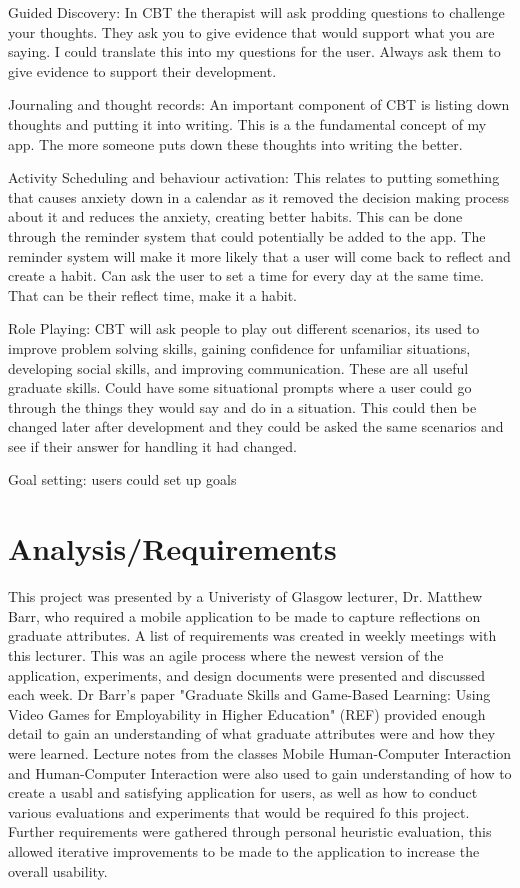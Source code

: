 \documentclass{l4proj}
\begin{document}
Guided Discovery: In CBT the therapist will ask prodding questions to challenge your thoughts. They ask you to give evidence that would support what you are 
saying. I could translate this into my questions for the user. Always ask them to give evidence to support their development.

Journaling and thought records: An important component of CBT is listing down thoughts and putting it into writing. This is a the fundamental concept of my app. 
The more someone puts down these thoughts into writing the better.

Activity Scheduling and behaviour activation: This relates to putting something that causes anxiety down in a calendar as it removed the decision making process 
about it and reduces the anxiety, creating better habits. This can be done through the reminder system that could potentially be added to the app. The reminder 
system will make it more likely that a user will come back to reflect and create a habit. Can ask the user to set a time for every day at the same time. That 
can be their reflect time, make it a habit.

Role Playing: CBT will ask people to play out different scenarios, its used to improve problem solving skills, gaining confidence for unfamiliar situations, 
developing social skills, and improving communication. These are all useful graduate skills. Could have some situational prompts where a user could go through 
the things they would say and do in a situation. This could then be changed later after development and they could be asked the same scenarios and see if their 
answer for handling it had changed.

Goal setting: users could set up goals

\chapter{Analysis/Requirements}

This project was presented by a Univeristy of Glasgow lecturer, Dr. Matthew Barr, who required a mobile application to be made 
to capture reflections on graduate attributes. A list of requirements was created in weekly meetings with this lecturer.
This was an agile process where the newest version of the application, experiments, and design documents were presented
and discussed each week. Dr Barr's paper "Graduate Skills and Game-Based Learning: Using Video Games for Employability in Higher 
Education" (REF) provided enough detail to gain an understanding of what graduate attributes were and how they were learned. 
Lecture notes from the classes Mobile Human-Computer Interaction and Human-Computer Interaction were also used to gain understanding
of how to create a usabl and satisfying application for users, as well as how to conduct various evaluations and experiments that would
be required fo this project.
Further requirements were gathered through personal heuristic evaluation, this allowed iterative improvements to be made to the
application to increase the overall usability.
\end{document}
